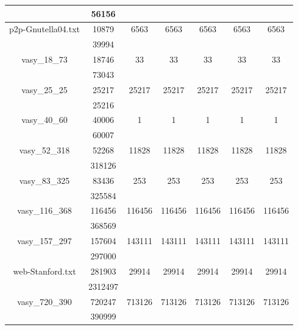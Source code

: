 \documentclass[../master/master.tex]{subfiles}
\begin{document}
\begin{center}
\begin{tabular}{ |c|c||c||c||c||c||c|| }
\cline{2-2}
 & 56156  & & & & & \\
\hline
\multirow{2}{3.8em}{p2p-Gnutella04.txt} & 10879 & \multirow{2}{3.8em}{6563} & \multirow{2}{3.8em}{6563} & \multirow{2}{3.8em}{6563} & \multirow{2}{3.8em}{6563} & \multirow{2}{3.8em}{6563} \\
\cline{2-2}
 & 39994  & & & & & \\
\hline
\multirow{2}{3.8em}{vasy\_18\_73} & 18746 & \multirow{2}{3.8em}{33} & \multirow{2}{3.8em}{33} & \multirow{2}{3.8em}{33} & \multirow{2}{3.8em}{33} & \multirow{2}{3.8em}{33} \\
\cline{2-2}
 & 73043  & & & & & \\
\hline
\multirow{2}{3.8em}{vasy\_25\_25} & 25217 & \multirow{2}{3.8em}{25217} & \multirow{2}{3.8em}{25217} & \multirow{2}{3.8em}{25217} & \multirow{2}{3.8em}{25217} & \multirow{2}{3.8em}{25217} \\
\cline{2-2}
 & 25216  & & & & & \\
\hline
\multirow{2}{3.8em}{vasy\_40\_60} & 40006 & \multirow{2}{3.8em}{1} & \multirow{2}{3.8em}{1} & \multirow{2}{3.8em}{1} & \multirow{2}{3.8em}{1} & \multirow{2}{3.8em}{1} \\
\cline{2-2}
 & 60007  & & & & & \\
\hline
\multirow{2}{3.8em}{vasy\_52\_318} & 52268 & \multirow{2}{3.8em}{11828} & \multirow{2}{3.8em}{11828} & \multirow{2}{3.8em}{11828} & \multirow{2}{3.8em}{11828} & \multirow{2}{3.8em}{11828} \\
\cline{2-2}
 & 318126  & & & & & \\
\hline
\multirow{2}{3.8em}{vasy\_83\_325} & 83436 & \multirow{2}{3.8em}{253} & \multirow{2}{3.8em}{253} & \multirow{2}{3.8em}{253} & \multirow{2}{3.8em}{253} & \multirow{2}{3.8em}{253} \\
\cline{2-2}
 & 325584  & & & & & \\
\hline
\multirow{2}{3.8em}{vasy\_116\_368} & 116456 & \multirow{2}{3.8em}{116456} & \multirow{2}{3.8em}{116456} & \multirow{2}{3.8em}{116456} & \multirow{2}{3.8em}{116456} & \multirow{2}{3.8em}{116456} \\
\cline{2-2}
 & 368569  & & & & & \\
\hline
\multirow{2}{3.8em}{vasy\_157\_297} & 157604 & \multirow{2}{3.8em}{143111} & \multirow{2}{3.8em}{143111} & \multirow{2}{3.8em}{143111} & \multirow{2}{3.8em}{143111} & \multirow{2}{3.8em}{143111} \\
\cline{2-2}
 & 297000  & & & & & \\
\hline
\multirow{2}{3.8em}{web-Stanford.txt} & 281903 & \multirow{2}{3.8em}{29914} & \multirow{2}{3.8em}{29914} & \multirow{2}{3.8em}{29914} & \multirow{2}{3.8em}{29914} & \multirow{2}{3.8em}{29914} \\
\cline{2-2}
 & 2312497  & & & & & \\
\hline
\multirow{2}{3.8em}{vasy\_720\_390} & 720247 & \multirow{2}{3.8em}{713126} & \multirow{2}{3.8em}{713126} & \multirow{2}{3.8em}{713126} & \multirow{2}{3.8em}{713126} & \multirow{2}{3.8em}{713126} \\
\cline{2-2}
 & 390999  & & & & & \\
\hline
\end{tabular}
\end{center}
\end{document}
